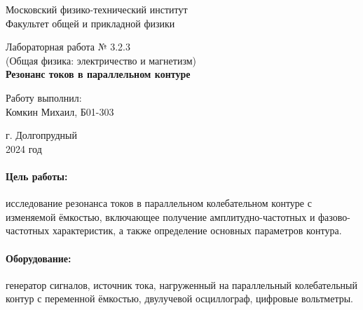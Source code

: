 \documentclass[a4paper, 12pt]{article}
\begin{document}
\begin{titlepage}
	\begin{center}
		\large 	Московский физико-технический институт \\
		Факультет общей и прикладной физики \\
		\vspace{0.2cm}
		
		\vspace{4.5cm}
		Лабораторная работа № 3.2.3\\ \vspace{0.2cm}
		\large (Общая физика: электричество и магнетизм) \\ \vspace{0.2cm}
		\LARGE \textbf{Резонанс токов в параллельном контуре}
	\end{center}
	\vspace{2.3cm} \large
	
	\begin{center}
		Работу выполнил: \\
		Комкин Михаил,
		Б01-303
		\vspace{10mm}		
		
	\end{center}
	
	\begin{center} \vspace{60mm}
		г. Долгопрудный \\
		2024 год
	\end{center}
\end{titlepage}



\paragraph*{Цель работы:} исследование резонанса токов в параллельном колебательном контуре с изменяемой
ёмкостью, включающее получение амплитудно-частотных и фазово-частотных характеристик, а также определение основных параметров контура.

\paragraph*{Оборудование:} генератор сигналов, источник тока, нагруженный на параллельный колебательный контур с переменной ёмкостью, двулучевой осциллограф, цифровые вольтметры.
\end{document}
